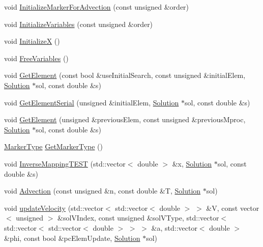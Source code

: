 \begin{DoxyCompactItemize}
\item 
void \mbox{\hyperlink{classfemus_1_1_marker_aa6e8a4686a99871432dc148aacba994e}{Initialize\+Marker\+For\+Advection}} (const unsigned \&order)
\item 
void \mbox{\hyperlink{classfemus_1_1_marker_a81a9d7437fc6b0107e60dca65b748d08}{Initialize\+Variables}} (const unsigned \&order)
\item 
void \mbox{\hyperlink{classfemus_1_1_marker_ad2c82ba7bfd5465b6c90bd089b817311}{InitializeX}} ()
\item 
void \mbox{\hyperlink{classfemus_1_1_marker_a91622587feb95d2370c17b3c863edbe2}{Free\+Variables}} ()
\item 
void \mbox{\hyperlink{classfemus_1_1_marker_a6bdbbae6d9f6ad313b94b505e92d1e15}{Get\+Element}} (const bool \&use\+Initial\+Search, const unsigned \&initial\+Elem, \mbox{\hyperlink{classfemus_1_1_solution}{Solution}} $\ast$sol, const double \&s)
\item 
void \mbox{\hyperlink{classfemus_1_1_marker_a1ac39140dc5ae49f5c09f4637e31e2bb}{Get\+Element\+Serial}} (unsigned \&initial\+Elem, \mbox{\hyperlink{classfemus_1_1_solution}{Solution}} $\ast$sol, const double \&s)
\item 
void \mbox{\hyperlink{classfemus_1_1_marker_ab3666724a2f8b99d7a4fe2212fd4b385}{Get\+Element}} (unsigned \&previous\+Elem, const unsigned \&previous\+Mproc, \mbox{\hyperlink{classfemus_1_1_solution}{Solution}} $\ast$sol, const double \&s)
\item 
\mbox{\hyperlink{_marker_type_enum_8hpp_ade22213fff69cfb37d8238e8fd3073df}{Marker\+Type}} \mbox{\hyperlink{classfemus_1_1_marker_a7c56dc40e741357dfa59c0fc374a4199}{Get\+Marker\+Type}} ()
\item 
void \mbox{\hyperlink{classfemus_1_1_marker_add09f327a09bf24a1f2a9950ee1bdfab}{Inverse\+Mapping\+T\+E\+ST}} (std\+::vector$<$ double $>$ \&x, \mbox{\hyperlink{classfemus_1_1_solution}{Solution}} $\ast$sol, const double \&s)
\item 
void \mbox{\hyperlink{classfemus_1_1_marker_a3149518c1d6ee9b53189f5ee658772b7}{Advection}} (const unsigned \&n, const double \&T, \mbox{\hyperlink{classfemus_1_1_solution}{Solution}} $\ast$sol)
\item 
void \mbox{\hyperlink{classfemus_1_1_marker_a67ad7172973fd2e038e9d96cb34d2e3b}{update\+Velocity}} (std\+::vector$<$ std\+::vector$<$ double $>$ $>$ \&V, const vector$<$ unsigned $>$ \&sol\+V\+Index, const unsigned \&sol\+V\+Type, std\+::vector$<$ std\+::vector$<$ std\+::vector$<$ double $>$ $>$ $>$ \&a, std\+::vector$<$ double $>$ \&phi, const bool \&pc\+Elem\+Update, \mbox{\hyperlink{classfemus_1_1_solution}{Solution}} $\ast$sol)

\end{DoxyCompactItemize}
